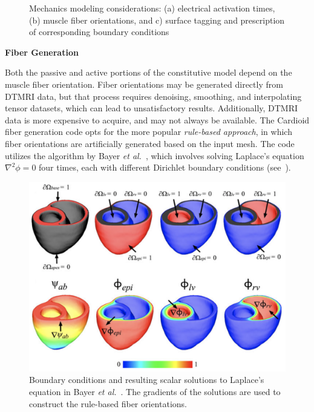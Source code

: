 \begin{figure}
{\label{fig:supp3}}
%
\caption{Mechanics modeling considerations: (a) electrical activation times, (b) muscle fiber orientations, and c) surface tagging and prescription of corresponding boundary conditions}
\label{fig:supp}
\end{figure}

\textbf{Fiber Generation}

Both the passive and active portions of the constitutive model depend on the muscle fiber orientation. Fiber orientations may be generated directly from DTMRI data, but that process requires denoising, smoothing, and interpolating tensor datasets, which can lead to unsatisfactory results. Additionally, DTMRI data is more expensive to acquire, and may not always be available. The Cardioid fiber generation code opts for the more popular \textit{rule-based approach}, in which fiber orientations are artificially generated based on the input mesh. The code utilizes the algorithm by Bayer \textit{et al.}~\cite{bayer_2012}, which involves solving Laplace's equation $\nabla^2\phi = 0$ four times, each with different Dirichlet boundary conditions (see~).

\begin{figure}[ht]
\centering
		\includegraphics[scale=0.3]{media/bayer.png}
\caption{Boundary conditions and resulting scalar solutions to Laplace's equation in Bayer \textit{et al.}~\cite{bayer_2012}. The gradients of the solutions are used to construct the rule-based fiber orientations.}
\label{fig:bayer}
\end{figure}

